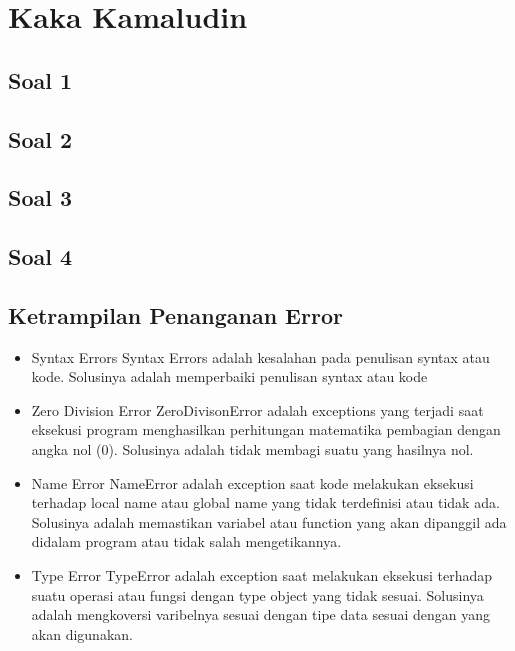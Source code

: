
\section{Kaka Kamaludin}
\subsection{Soal 1}


\subsection{Soal 2}


\subsection{Soal 3}


\subsection{Soal 4}


\subsection{Ketrampilan Penanganan Error}
\begin{itemize}
\item Syntax Errors
Syntax Errors adalah kesalahan pada penulisan syntax atau kode. Solusinya adalah memperbaiki penulisan syntax atau kode

\item Zero Division Error
ZeroDivisonError adalah exceptions yang terjadi saat eksekusi program menghasilkan perhitungan matematika pembagian dengan angka nol (0). Solusinya adalah tidak membagi suatu yang hasilnya nol.

\item Name Error
NameError adalah exception saat kode melakukan eksekusi terhadap local name atau global name yang tidak terdefinisi atau tidak ada. Solusinya adalah memastikan variabel atau function yang akan dipanggil ada didalam program atau tidak salah mengetikannya.

\item Type Error
TypeError adalah exception saat melakukan eksekusi terhadap suatu operasi atau fungsi dengan type object yang tidak sesuai. Solusinya adalah mengkoversi varibelnya sesuai dengan tipe data sesuai dengan yang akan digunakan.

\end{itemize}
